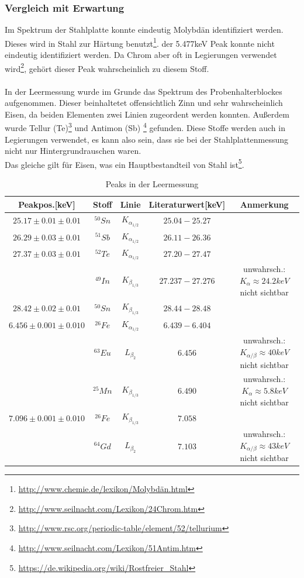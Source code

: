 \documentclass[12pt,a4paper]{article}
\begin{document}
\subsubsection{Vergleich mit Erwartung}
Im Spektrum der Stahlplatte konnte eindeutig Molybdän identifiziert werden. Dieses wird in Stahl zur Härtung benutzt\footnote{\url{http://www.chemie.de/lexikon/Molybdän.html}}. der 5.477keV Peak konnte nicht eindeutig identifiziert werden. Da Chrom aber oft in Legierungen verwendet wird\footnote{\url{http://www.seilnacht.com/Lexikon/24Chrom.htm}}, gehört dieser Peak wahrscheinlich zu diesem Stoff.\\
\\
In der Leermessung wurde im Grunde das Spektrum des Probenhalterblockes aufgenommen. Dieser beinhaltetet offensichtlich Zinn  und sehr wahrscheinlich Eisen, da beiden Elementen zwei Linien zugeordent werden konnten. 
Außerdem wurde Tellur (Te)\footnote{\url{http://www.rsc.org/periodic-table/element/52/tellurium}} und Antimon (Sb) \footnote{\url{http://www.seilnacht.com/Lexikon/51Antim.htm}} gefunden. Diese Stoffe werden auch in Legierungen verwendet, es kann also sein, dass sie bei der Stahlplattenmessung nicht nur Hintergrundrauschen waren.\\
Das gleiche gilt für Eisen, was ein Hauptbestandteil von Stahl ist\footnote{\url{https://de.wikipedia.org/wiki/Rostfreier_Stahl}}.

\begin{table}
\center
\begin{tabular}{|c|c|c|c|c|}
\hline 
Peakpos.[keV] & Stoff & Linie & Literaturwert[keV] & Anmerkung \\
\hline 
$25.17\pm 0.01\pm 0.01$& $^{50}Sn$ & $K_{\alpha_{1/2}}$ & $25.04-25.27$ & \\ 
\hline 
$26.29\pm 0.03\pm 0.01$ & $^{51}Sb$ & $K_{\alpha_{1/2}}$ & $26.11-26.36$ & \\ 
\hline 
$27.37\pm 0.03\pm 0.01$ & $^{52}Te$ & $K_{\alpha_{1/2}}$ & $27.20-27.47$ & \\ 
 & $^{49}In$ & $K_{\beta_{1/3}}$ & $27.237-27.276$ & unwahrsch.: $K_{\alpha}\approx 24.2keV$ nicht sichtbar\\ 
\hline 
$28.42\pm 0.02\pm 0.01$ & $^{50}Sn$ & $K_{\beta_{1/3}}$ & $28.44-28.48$ &\\ 
\hline 
$6.456\pm 0.001\pm 0.010$ & $^{26}Fe$ & $K_{\alpha_{1/2}}$ & $6.439-6.404$ &\\ 
& $^{63}Eu$ & $L_{\beta_{2}}$ & $6.456$ & unwahrsch.: $K_{\alpha/\beta}\approx 40keV$ nicht sichtbar\\
& $^{25}Mn$ & $K_{\beta_{1/3}}$ & $6.490$ & unwahrsch.: $K_{\alpha}\approx 5.8keV$ nicht sichtbar\\
\hline 
$7.096\pm 0.001\pm 0.010$ & $^{26}Fe$ & $K_{\beta_{1/3}}$ & $7.058$ & \\ 
& $^{64}Gd$ & $L_{\beta_{2}}$ & $7.103$ & unwahrsch.:$K_{\alpha/\beta}\approx 43keV$ nicht sichtbar\\
\hline 
\end{tabular} 
\caption{Peaks in der Leermessung}
\label{tab:a_peaks_leer}
\end{table}
\end{document}

